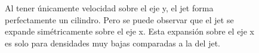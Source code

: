 \documentclass[12pt,a4paper]{book}
\begin{document}
\begin{figure}
\centering
{}
\caption{\label{fig:jet_ma_bajo_densidad}Al tener únicamente velocidad sobre el eje y, el jet forma perfectamente un cilindro. Pero se puede observar que el jet se expande simétricamente sobre el eje x. Esta expansión sobre el eje x es solo para densidades muy bajas comparadas a la del jet.}
\end{figure}
\end{document}
